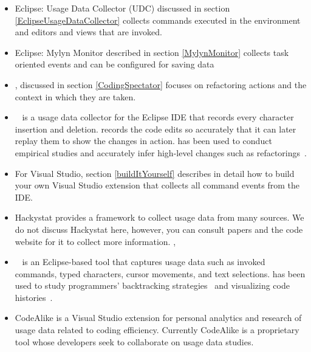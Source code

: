 \begin{itemize}

	\item Eclipse: Usage Data Collector (UDC) discussed in section \ref{EclipseUsageDataCollector} collects commands executed in the environment and editors and views that are invoked.
	
	\item Eclipse: Mylyn Monitor described in section \ref{MylynMonitor} collects task oriented events and can be configured for saving data
	
        \item \CodingSpectator %
, discussed in section \ref{CodingSpectator} focuses on refactoring actions and the context in which they are taken.

        \item \CodingTracker~\cite{NegaraETAL2012Dangerous} is a usage data collector for the Eclipse IDE that records every character insertion and deletion. \CodingTracker{} records the code edits so accurately that it can later replay them to show the changes in action. \CodingTracker{} has been used to conduct empirical studies and accurately infer high-level changes such as refactorings~\cite{NegaraETAL2013ManualRefactorings}.
	
	\item For Visual Studio, section \ref{buildItYourself} describes in detail how to build your own Visual Studio extension that collects all command events from the IDE.
	
	\item Hackystat provides a framework to collect usage data from many sources.  We do not discuss Hackystat here, however, you can consult papers and the code website for it to collect more information. \cite{V:johnson2003beyond}, %

        \item \Fluorite~\cite{YoonMyers2011Flourite} is an Eclipse-based tool that captures usage data such as invoked commands, typed characters, cursor movements, and text selections. \Fluorite{} has been used to study programmers' backtracking strategies~\cite{YoonMyers2012Backtracking} and visualizing code histories~\cite{YoonETAL2013VisualizeChange}.
	
	\item CodeAlike is a Visual Studio extension for personal analytics and research of usage data related to coding efficiency.  Currently CodeAlike is a proprietary tool whose developers seek to collaborate on usage data studies.

\end{itemize}

